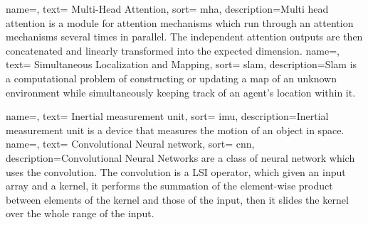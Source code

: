\renewcommand{\acronymname}{Acronimi e abbreviazioni}

{
    name=,
    text= Multi-Head Attention,
    sort= mha,
    description={Multi head attention is a module for attention mechanisms which run through an attention mechanisms several times in parallel. The independent attention outputs are then concatenated and linearly transformed into the expected dimension.}
}
{
    name=,
    text= Simultaneous Localization and Mapping,
    sort= slam,
    description={Slam is a computational problem of constructing or updating a map of an unknown environment while simultaneously keeping track of an agent's location within it.}
}

{
    name=,
    text= Inertial measurement unit,
    sort= imu,
    description={Inertial measurement unit is a device that measures the motion of an object in space.} %
}
{
    name=,
    text= Convolutional Neural network,
    sort= cnn,
    description={Convolutional Neural Networks are a class of neural network which uses the convolution.
    The convolution is a LSI operator, which given an input array and a kernel, it performs the summation of the element-wise product between elements of the kernel and those of the input, then it slides the kernel over the whole range of the input. } %
}

